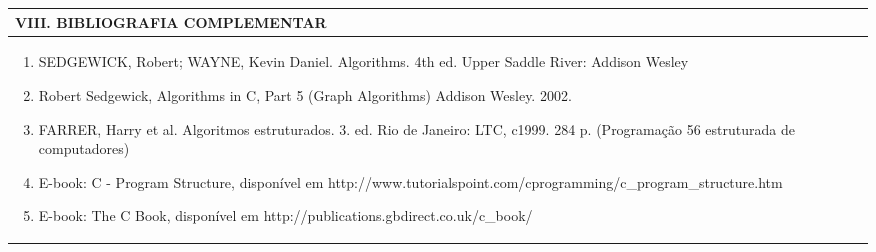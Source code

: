 \documentclass[12pt]{article}
\begin{document}
\newpage

\begin{longtable}{|L{1.025\textwidth}|} \hline
%
{\bf VIII. BIBLIOGRAFIA COMPLEMENTAR} \\ \hline
\begin{enumerate}
\item SEDGEWICK, Robert; WAYNE, Kevin Daniel. Algorithms. 4th ed. Upper Saddle River: Addison Wesley 
\item Robert Sedgewick, Algorithms in C, Part 5 (Graph Algorithms) Addison Wesley. 2002.
\item FARRER, Harry et al. Algoritmos estruturados. 3. ed. Rio de Janeiro: LTC, c1999. 284 p. (Programação 56 estruturada de computadores) 
\item E-book: C - Program Structure, disponível em http://www.tutorialspoint.com/cprogramming/c\_program\_structure.htm 
\item  E-book: The C Book, disponível em http://publications.gbdirect.co.uk/c\_book/

\end{enumerate}
 \\ \hline
\end{longtable}



\end{document}
